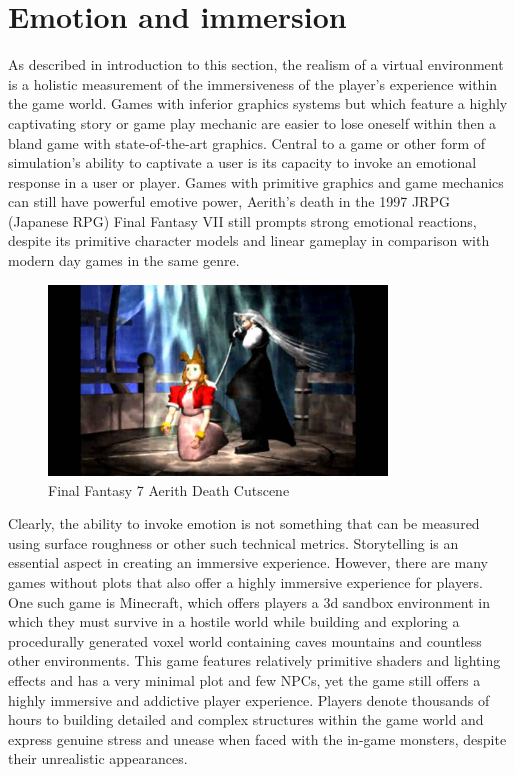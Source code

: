 \section{Emotion and immersion}
As described in introduction to this section, the realism of a virtual environment is a holistic measurement of the immersiveness of the player's experience within the game world. Games with inferior graphics systems but which feature a highly captivating story or game play mechanic are easier to lose oneself within then a bland game with state-of-the-art graphics. Central to a game or other form of simulation's ability to captivate a user is its capacity to invoke an emotional response in a user or player. Games with primitive graphics and game mechanics can still have powerful emotive power, Aerith's death in the 1997 JRPG (Japanese RPG) Final Fantasy VII still prompts strong emotional reactions, despite its primitive character models and linear gameplay in comparison with modern day games in the same genre. \cite{fig:FF7} 
\begin{figure}[ht!]
\centering
\includegraphics[width=90mm]{maxresdefault.jpg}
\caption{Final Fantasy 7 Aerith Death Cutscene \label{overflow}}
\label{fig:FF7}
\end{figure}
Clearly, the ability to invoke emotion is not something that can be measured using surface roughness or other such technical metrics. Storytelling is an essential aspect in creating an immersive experience. However, there are many games without plots that also offer a highly immersive experience for players. One such game is Minecraft, which offers players a 3d sandbox environment in which they must survive in a hostile world while building and exploring a procedurally generated voxel world containing caves mountains and countless other environments. This game features relatively primitive shaders and lighting effects and has a very minimal plot and few NPCs, yet the game still offers a highly immersive and addictive player experience. Players denote thousands of hours to building detailed and complex structures within the game world and express genuine stress and unease when faced with the in-game monsters, despite their unrealistic appearances. \cite{fig:MCmonster} 
